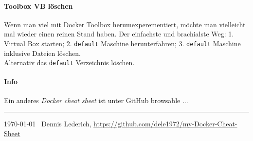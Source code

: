 \documentclass[10pt,landscape]{article}
\begin{document}
\begin{multicols}{2}
\paragraph{Toolbox VB löschen} Wenn man viel mit Docker Toolbox herumexperementiert, möchte man vielleicht mal wieder einen reinen Stand haben. Der einfachste und brachialste Weg: 1. Virtual Box starten; 2. \verb!default! Maschine herunterfahren; 3. \verb!default! Maschine inklusive Dateien löschen.\\
Alternativ das \verb!default! Verzeichnis löschen.

\paragraph{Info} Ein anderes \emph{Docker cheat sheet} \cite{odcs} ist unter GitHub browsable ...

\printbibliography



\hrule\medskip
\today ~ Dennis Lederich, \href{https://github.com/dele1972/my-Docker-Cheat-Sheet}{https://github.com/dele1972/my-Docker-Cheat-Sheet}
\end{multicols}
\end{document}
